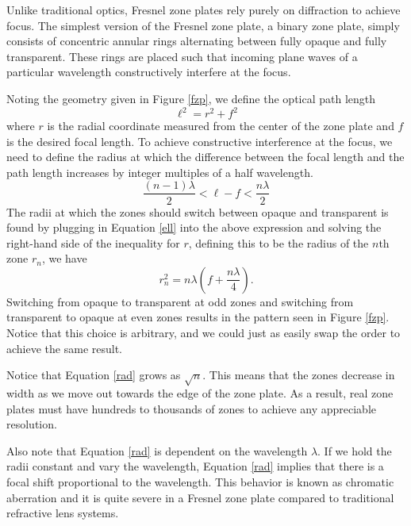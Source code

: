\documentclass[10pt,letterpaper]{article}
\begin{document}
		Unlike traditional optics, Fresnel zone plates rely purely on diffraction to achieve focus. The simplest version of the Fresnel zone plate, a binary zone plate, simply consists of concentric annular rings alternating between fully opaque and fully transparent. These rings are placed such that incoming plane waves of a particular wavelength constructively interfere at the focus.
		
		Noting the geometry given in Figure \ref{fzp}, we define the optical path length
		\begin{equation}
			\ell^2 = r^2 + f^2
			\label{ell}
		\end{equation}
		where $r$ is the radial coordinate measured from the center of the zone plate and $f$ is the desired focal length. To achieve constructive interference at the focus, we need to define the radius at which the difference between the focal length and the path length increases by integer multiples of a half wavelength.
		\begin{equation}
			\frac{(n-1)\lambda}{2} < \ell - f < \frac{n \lambda}{2}
		\end{equation}
		The radii at which the zones should switch between opaque and transparent is found by plugging in Equation \ref{ell} into the above expression and solving the right-hand side of the inequality for $r$, defining this to be the radius of the $n$th zone $r_n$, we have
		\begin{equation}
			r_n^2 = n \lambda \left( f + \frac{n \lambda}{4} \right).
			\label{rad}
		\end{equation}
		Switching from opaque to transparent at odd zones and switching from transparent to opaque at even zones results in the pattern seen in Figure \ref{fzp}. Notice that this choice is arbitrary, and we could just as easily swap the order to achieve the same result.
		
		Notice that Equation \ref{rad} grows as $\sqrt{n}$. This means that the zones decrease in width as we move out towards the edge of the zone plate. As a result, real zone plates must have hundreds to thousands of zones to achieve any appreciable resolution.
		
		Also note that Equation \ref{rad} is dependent on the wavelength $\lambda$. If we hold the radii constant and vary the wavelength, Equation \ref{rad} implies that there is a focal shift proportional to the wavelength. This behavior is known as chromatic aberration and it is quite severe in a Fresnel zone plate compared to traditional refractive lens systems.
		
\end{document}
